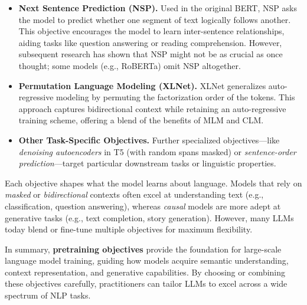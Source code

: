 \begin{itemize}
    \item \textbf{Next Sentence Prediction (NSP).}
    Used in the original BERT, NSP asks the model to predict whether one segment of text logically follows another. This objective encourages the model to learn inter-sentence relationships, aiding tasks like question answering or reading comprehension. However, subsequent research has shown that NSP might not be as crucial as once thought; some models (e.g., RoBERTa) omit NSP altogether.

    \item \textbf{Permutation Language Modeling (XLNet).}
    XLNet generalizes auto-regressive modeling by permuting the factorization order of the tokens. This approach captures bidirectional context while retaining an auto-regressive training scheme, offering a blend of the benefits of MLM and CLM.

    \item \textbf{Other Task-Specific Objectives.}
    Further specialized objectives—like \emph{denoising autoencoders} in T5 (with random spans masked) or \emph{sentence-order prediction}—target particular downstream tasks or linguistic properties.

\end{itemize}
\noindent
Each objective shapes what the model learns about language. Models that rely on \emph{masked} or \emph{bidirectional} contexts often excel at understanding text (e.g., classification, question answering), whereas \emph{causal} models are more adept at generative tasks (e.g., text completion, story generation). However, many LLMs today blend or fine-tune multiple objectives for maximum flexibility.

\noindent
In summary, \textbf{pretraining objectives} provide the foundation for large-scale language model training, guiding how models acquire semantic understanding, context representation, and generative capabilities. By choosing or combining these objectives carefully, practitioners can tailor LLMs to excel across a wide spectrum of NLP tasks. 

